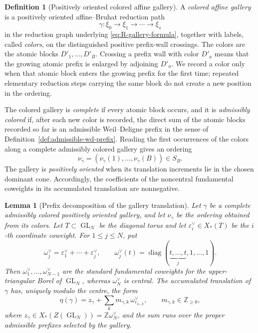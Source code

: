 \documentclass[12pt]{article}
\newtheorem{lemma}[theorem]{Lemma}
\theoremstyle{definition}
\newtheorem{definition}[theorem]{Definition}
\theoremstyle{remark}
\DeclareMathOperator{\GL}{GL}
\begin{document}
\begin{definition}[Positively oriented colored affine gallery]
\label{def:colored-affine-gallery}
A \emph{colored affine gallery} is a positively oriented affine--Bruhat
reduction path
\[
 \gamma:\xi_0\longrightarrow\xi_1\longrightarrow\cdots
 \longrightarrow\xi_s
\]
in the reduction graph underlying \eqref{eq:R-gallery-formula}, together
with labels, called \emph{colors}, on the distinguished positive
prefix-wall crossings.  The colors are the atomic blocks
\(D'_1,\ldots,D'_B\).  Crossing a prefix wall with color \(D'_a\) means that
the growing atomic prefix is enlarged by adjoining \(D'_a\).  We record a
color only when that atomic block enters the growing prefix for the first
time; repeated elementary reduction steps carrying the same block do not
create a new position in the ordering.

The colored gallery is \emph{complete} if every atomic block occurs, and it
is \emph{admissibly colored} if, after each new color is recorded, the direct
sum of the atomic blocks recorded so far is an admissible Weil--Deligne
prefix in the sense of Definition~\ref{def:admissible-wd-prefix}.  Reading
the first occurrences of the colors along a complete admissibly colored
gallery gives an ordering
\[
 \nu_\gamma=(\nu_\gamma(1),\ldots,\nu_\gamma(B))\in S_B.
\]
The gallery is \emph{positively oriented} when its translation increments
lie in the chosen dominant cone.  Accordingly, the coefficients of the
noncentral fundamental coweights in its accumulated translation are
nonnegative.
\end{definition}

\begin{lemma}[Prefix decomposition of the gallery translation]
\label{lem:gallery-prefix-translation-decomposition}
Let \(\gamma\) be a complete admissibly colored positively oriented gallery,
and let \(\nu_\gamma\) be the ordering obtained from its colors.  Let
\(T\subset\GL_N\) be the diagonal torus and let
\(\varepsilon_i^\vee\in X_*(T)\) be the \(i\)-th coordinate coweight.  For
\(1\leq j\leq N\), put
\begin{equation}\label{eq:standard-fundamental-coweights}
 \omega_j^\vee
 =\varepsilon_1^\vee+\cdots+\varepsilon_j^\vee,
 \qquad
 \omega_j^\vee(t)
 =\operatorname{diag}(\underbrace{t,\ldots,t}_{j},1,\ldots,1).
\end{equation}
Then \(\omega_1^\vee,\ldots,\omega_{N-1}^\vee\) are the standard
fundamental coweights for the upper-triangular Borel of \(\GL_N\), whereas
\(\omega_N^\vee\) is central.  The accumulated translation of \(\gamma\)
has, uniquely modulo the centre, the form
\begin{equation}\label{eq:gallery-translation-prefix-decomposition}
 \eta(\gamma)
 =z_\gamma+
 \sum_km_{\gamma,k}\,
 \omega_{r_{\nu_\gamma,k}}^\vee,
 \qquad
 m_{\gamma,k}\in\mathbb Z_{\geq0},
\end{equation}
where
\(z_\gamma\in X_*(Z(\GL_N))=\mathbb Z\omega_N^\vee\), and the sum runs over
the proper admissible prefixes selected by the gallery.
\end{lemma}
\end{document}
